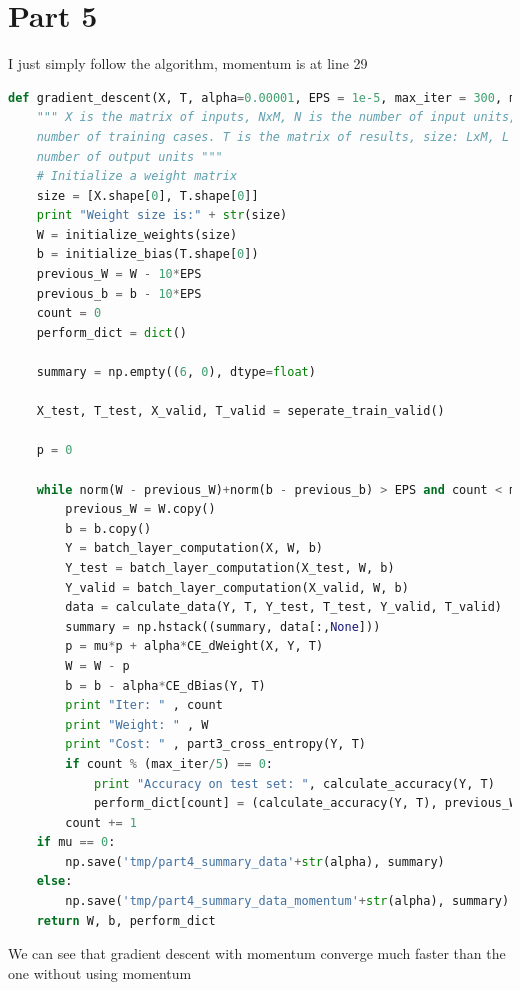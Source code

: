 \documentclass[12pt]{article}
\begin{document}
\section{Part 5}
I just simply follow the algorithm, momentum is at line 29
\begin{lstlisting}[language=Python]
def gradient_descent(X, T, alpha=0.00001, EPS = 1e-5, max_iter = 300, mu = 0):
    """ X is the matrix of inputs, NxM, N is the number of input units, M is the 
    number of training cases. T is the matrix of results, size: LxM, L is the 
    number of output units """
    # Initialize a weight matrix
    size = [X.shape[0], T.shape[0]]
    print "Weight size is:" + str(size)
    W = initialize_weights(size)
    b = initialize_bias(T.shape[0])
    previous_W = W - 10*EPS
    previous_b = b - 10*EPS
    count = 0
    perform_dict = dict()

    summary = np.empty((6, 0), dtype=float)

    X_test, T_test, X_valid, T_valid = seperate_train_valid()

    p = 0
    
    while norm(W - previous_W)+norm(b - previous_b) > EPS and count < max_iter:
        previous_W = W.copy()
        b = b.copy()
        Y = batch_layer_computation(X, W, b)
        Y_test = batch_layer_computation(X_test, W, b)
        Y_valid = batch_layer_computation(X_valid, W, b)
        data = calculate_data(Y, T, Y_test, T_test, Y_valid, T_valid)
        summary = np.hstack((summary, data[:,None]))
        p = mu*p + alpha*CE_dWeight(X, Y, T)
        W = W - p
        b = b - alpha*CE_dBias(Y, T)
        print "Iter: " , count
        print "Weight: " , W
        print "Cost: " , part3_cross_entropy(Y, T)
        if count % (max_iter/5) == 0:
            print "Accuracy on test set: ", calculate_accuracy(Y, T)
            perform_dict[count] = (calculate_accuracy(Y, T), previous_W, previous_b)
        count += 1
    if mu == 0:
        np.save('tmp/part4_summary_data'+str(alpha), summary)
    else:
        np.save('tmp/part4_summary_data_momentum'+str(alpha), summary)
    return W, b, perform_dict
\end{lstlisting}
We can see that gradient descent with momentum converge much faster than the one without using momentum
\end{document}
